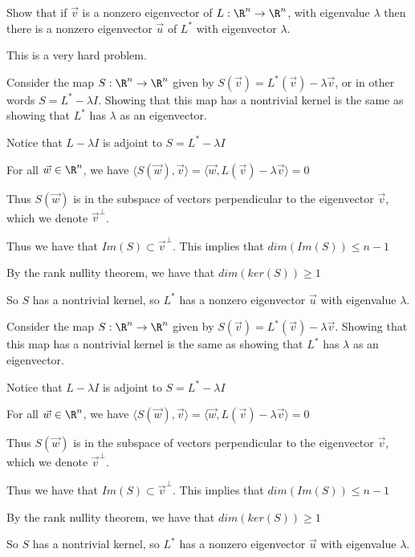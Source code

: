 \documentclass{ximera}
\begin{document}
		
			Show that if $\vec{v}$ is a nonzero eigenvector of $L:\R^n \to \R^n$, with eigenvalue $\lambda$ then
			there is a nonzero eigenvector $\vec{u}$ of $L^*$ with eigenvector $\lambda$. 
\begin{warning}
	This is a very hard problem.
\end{warning}
\begin{hint}
	Consider the map $S: \R^n \to \R^n$ given by $S(\vec{v}) = L^*(\vec{v}) - \lambda \vec{v}$, or in other words $S = L^* - \lambda I$.  Showing that this map has a nontrivial kernel is the same as
	showing that $L^*$ has $\lambda$ as an eigenvector.
\end{hint}
\begin{hint}
	Notice that $L-\lambda I$ is adjoint to $S = L^* -\lambda I$
\end{hint}
\begin{hint}
	For all $\vec{w} \in \R^n$, we have $\langle S(\vec{w}),\vec{v}\rangle = \langle \vec{w}, L(\vec{v}) - \lambda \vec{v}\rangle = 0$
\end{hint}
\begin{hint}
	Thus $S(\vec{w})$ is in the subspace of vectors perpendicular to the eigenvector $\vec{v}$, which we denote $\vec{v}^\perp$.
\end{hint}
\begin{hint}
	Thus we have that $Im(S) \subset \vec{v}^\perp$.  This implies that $dim(Im(S)) \leq n-1$
\end{hint}
\begin{hint}
	By the rank nullity theorem, we have that $dim(ker(S)) \geq 1$
\end{hint}
\begin{hint}
	So $S$ has a nontrivial kernel, so $L^*$ has a nonzero eigenvector $\vec{u}$ with eigenvalue $\lambda$. 
\end{hint}
\begin{free-response}
	Consider the map $S: \R^n \to \R^n$ given by $S(\vec{v}) = L^*(\vec{v}) - \lambda \vec{v}$.  Showing that this map has a nontrivial kernel is the same as
	showing that $L^*$ has $\lambda$ as an eigenvector.
	
	Notice that $L-\lambda I$ is adjoint to $S = L^* -\lambda I$
	
	For all $\vec{w} \in \R^n$, we have $\langle S(\vec{w}),\vec{v}\rangle = \langle \vec{w}, L(\vec{v}) - \lambda \vec{v}\rangle = 0$
	
	Thus $S(\vec{w})$ is in the subspace of vectors perpendicular to the eigenvector $\vec{v}$, which we denote $\vec{v}^\perp$.
	
	Thus we have that $Im(S) \subset \vec{v}^\perp$.  This implies that $dim(Im(S)) \leq n-1$
	
	By the rank nullity theorem, we have that $dim(ker(S)) \geq 1$
	
	So $S$ has a nontrivial kernel, so $L^*$ has a nonzero eigenvector $\vec{u}$ with eigenvalue $\lambda$. 
\end{free-response}
		
\end{document}
